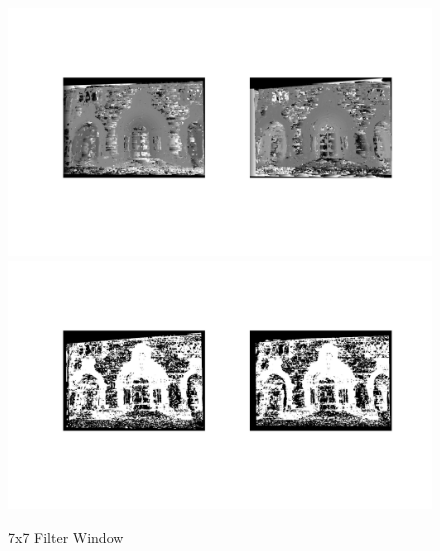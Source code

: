 \documentclass[12pt]{article}
\begin{document}
\begin{figure}[H]
	\centering
	\includegraphics[width=1.1\textwidth]{dc7_1.jpg}
	\includegraphics[width=1.1\textwidth]{dc7_2.jpg}
	\caption{7x7 Filter Window}
	\label{fig1}
\end{figure}
\vspace{5mm}
\end{document}
